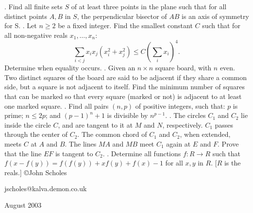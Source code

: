 \nopagenumbers
{}
\vskip 25pt
. Find all finite sets $S$ of at least three points in the plane such that for all distinct points $A, B$ in $S$, the perpendicular bisector of $AB$ is an axis of symmetry for S.
\vskip 12pt
. Let $n \ge 2$ be a fixed integer. Find the smallest constant $C$ such that for all non-negative reals $x_1, \ldots , x_n$: $$\sum_{i<j} x_i x_j (x_i^2 + x_j^2) \le C (\sum_i x_i)^4.$$ Determine when equality occurs.
\vskip 12pt
. Given an $n \times n$ square board, with $n$ even. Two distinct squares of the board are said to be adjacent if they share a common side, but a square is not adjacent to itself. Find the minimum number of squares that can be marked so that every square (marked or not) is adjacent to at least one marked square. 
\vskip 12pt
. Find all pairs $(n, p)$ of positive integers, such that: $p$ is prime; $n \le 2p$; and $(p-1)^n + 1$ is divisible by $n^{p-1}$.
\vskip 12pt
. The circles $C_1$ and $C_2$ lie inside the circle $C$, and are tangent to it at $M$ and $N$, respectively. $C_1$ passes through the center of $C_2$. The common chord of $C_1$ and $C_2$, when extended, meets $C$ at $A$ and $B$. The lines $MA$ and $MB$ meet $C_1$ again at $E$ and $F$. Prove that the line $EF$ is tangent to $C_2$.
\vskip 12pt
. Determine all functions $f: R \to R$ such that $f(x - f(y)) = f(f(y)) + x f(y) + f(x) - 1$ for all $x, y$ in $R$. [$R$ is the reals.]
\vskip 20pt
\noindent \copyright John Scholes

\noindent jscholes@kalva.demon.co.uk

 August 2003

\bye
